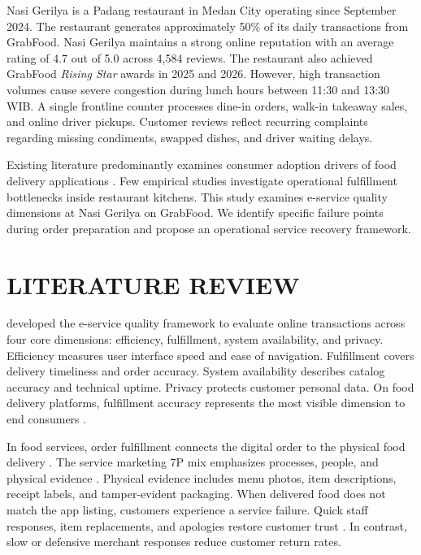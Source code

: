 \documentclass{jomas}
\begin{document}
Nasi Gerilya is a Padang restaurant in Medan City operating since September 2024. The restaurant generates approximately 50\% of its daily transactions from GrabFood. Nasi Gerilya maintains a strong online reputation with an average rating of 4.7 out of 5.0 across 4,584 reviews. The restaurant also achieved GrabFood \textit{Rising Star} awards in 2025 and 2026. However, high transaction volumes cause severe congestion during lunch hours between 11:30 and 13:30 WIB. A single frontline counter processes dine-in orders, walk-in takeaway sales, and online driver pickups. Customer reviews reflect recurring complaints regarding missing condiments, swapped dishes, and driver waiting delays.

Existing literature predominantly examines consumer adoption drivers of food delivery applications \parencite{putri2022grabfood}. Few empirical studies investigate operational fulfillment bottlenecks inside restaurant kitchens. This study examines e-service quality dimensions at Nasi Gerilya on GrabFood. We identify specific failure points during order preparation and propose an operational service recovery framework.

\section{LITERATURE REVIEW}
\textcite{parasuraman2005esqual} developed the e-service quality framework to evaluate online transactions across four core dimensions: efficiency, fulfillment, system availability, and privacy. Efficiency measures user interface speed and ease of navigation. Fulfillment covers delivery timeliness and order accuracy. System availability describes catalog accuracy and technical uptime. Privacy protects customer personal data. On food delivery platforms, fulfillment accuracy represents the most visible dimension to end consumers \parencite{santoso2023esatisfaction}.

In food services, order fulfillment connects the digital order to the physical food delivery \parencite{wirtz2024servicesmarketing}. The service marketing 7P mix emphasizes processes, people, and physical evidence \parencite{kotler2023principlesmarketing}. Physical evidence includes menu photos, item descriptions, receipt labels, and tamper-evident packaging. When delivered food does not match the app listing, customers experience a service failure. Quick staff responses, item replacements, and apologies restore customer trust \parencite{wirtz2024servicesmarketing,smith1999servicerecovery}. In contrast, slow or defensive merchant responses reduce customer return rates.
\end{document}
